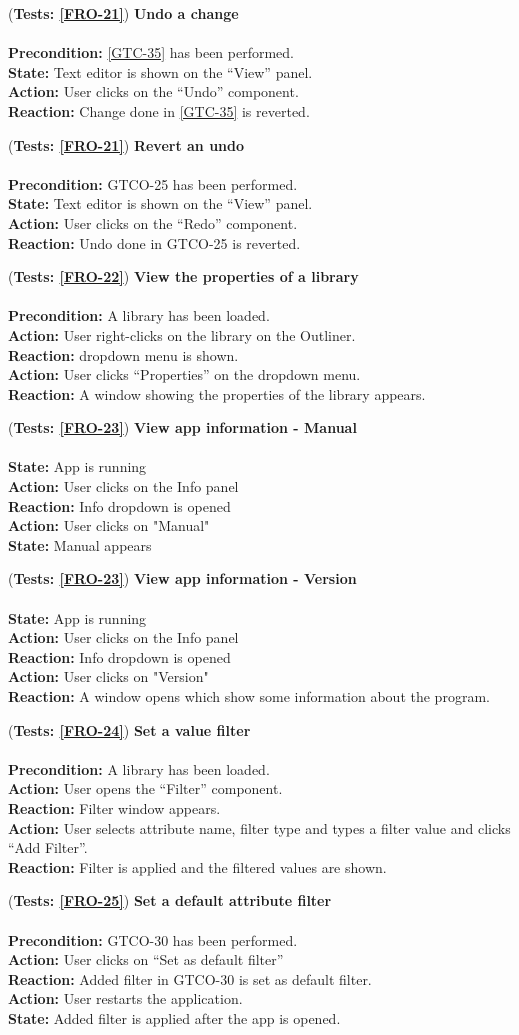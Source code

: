 \documentclass[10pt,a4paper]{report}
\newcommand{\precondition}[1]{
    \textbf{Precondition: } #1 \leavevmode \\
}
\newcommand{\action}[1]{
    \textbf{Action: } #1 \leavevmode \\
}
\newcommand{\state}[1]{
    \textbf{State: } #1 \leavevmode \\
}
\newcommand{\reaction}[1]{
    \textbf{Reaction: } #1 \leavevmode \\
}
\newcommand{\GTCODescription}[2]{
    (\textbf{Tests: #1}) \textbf{#2} \leavevmode \\
}
\begin{document}
\begin{GTCO}
    \item \GTCODescription{\ref{FRO-21}}{Undo a change} \leavevmode \\ \precondition{\ref{GTC-35} has been performed.}\state{Text editor is shown on the “View” panel.}\action{User clicks on the “Undo” component.}\reaction{Change done in \ref{GTC-35} is reverted.}
    
    \item \GTCODescription{\ref{FRO-21}}{Revert an undo} \leavevmode \\ \precondition{GTCO-25 has been performed.}\state{Text editor is shown on the “View” panel.}\action{User clicks on the “Redo” component.}\reaction{Undo done in GTCO-25 is reverted.}
    
     \item \GTCODescription{\ref{FRO-22}}{View the properties of a library} \leavevmode \\ \precondition{A library has been loaded.}\action{User right-clicks on the library on the Outliner.}\reaction{dropdown menu is shown.}\action{User clicks “Properties” on the dropdown menu.}\reaction{A window showing the properties of the library appears.}
     
     \item \GTCODescription{\ref{FRO-23}}{View app information - Manual} \leavevmode \\ \state{App is running}\action{User clicks on the Info panel}\reaction{Info dropdown is opened}\action{User clicks on "Manual"}\state{Manual appears}
     
     
     \item \GTCODescription{\ref{FRO-23}}{View app information - Version} \leavevmode \\ \state{App is running}\action{User clicks on the Info panel}\reaction{Info dropdown is opened}\action{User clicks on "Version"}\reaction{A window opens which show some information about the program.}
     
     \item \GTCODescription{\ref{FRO-24}}{Set a value filter} \leavevmode \\ \precondition{A library has been loaded.}\action{User opens the “Filter” component.}\reaction{Filter window appears.}\action{User selects attribute name, filter type and types a filter value and clicks “Add Filter”.}\reaction{Filter is applied and the filtered values are shown.}
    
   
    \item \GTCODescription{\ref{FRO-25}}{Set a default attribute filter} \leavevmode \\ \precondition{GTCO-30 has been performed.}\action{User clicks on “Set as default filter”}\reaction{Added filter in GTCO-30 is set as default filter.}\action{User restarts the application.}\state{Added filter is applied after the app is opened.}
    
\end{GTCO}
\end{document}
